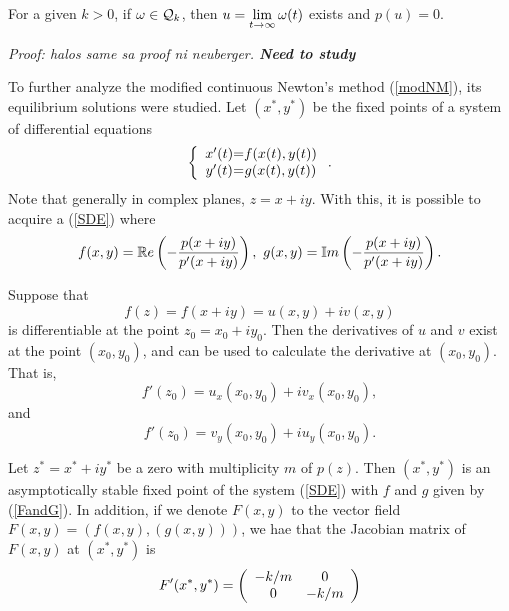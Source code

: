 \begin{thm}
	For a given $k>0$, if $\omega\in\mathcal{Q}_k$, then $u = \displaystyle\lim_{t\to\infty}\omega(t)$ exists and $p(u) = 0$.
\end{thm}
\textit{Proof: halos same sa proof ni neuberger. \textbf{Need to study}}


To further analyze the modified continuous Newton's method (\ref{modNM}), its equilibrium solutions were studied. Let $(x^*,y^*)$ be the 
fixed points of a system of differential equations
\begin{equation}	\label{SDE}
	\left\{ \begin{array}{c @{=} c}
		x'(t)	&	f(x(t),y(t))\\
		y'(t)	&	g(x(t),y(t))
	\end{array}\right. .
\end{equation}
Note that generally in complex planes, $z = x+iy$. With this, it is possible to acquire a (\ref{SDE}) where
\begin{equation}	\label{FandG}
	f(x,y) = \mathbb{R}e\left(	-\displaystyle\frac{p(x+iy)}{p'(x+iy)}	\right),\ g(x,y) = \mathbb{I}m\left(	-\displaystyle\frac{p(x+iy)}{p'(x+iy)}	\right) .
\end{equation}

\begin{thm}
	Suppose that $$f(z) = f(x+iy) = u(x,y) + iv(x,y)$$ is differentiable at the point $z_0 = x_0 + iy_0$. Then the derivatives of $u$ and $v$ exist at the point $(x_0,y_0)$, and can be used to calculate the derivative at $(x_0,y_0)$. That is,
	$$f'(z_0) = u_x(x_0,y_0) + iv_x(x_0,y_0),$$ and $$f'(z_0) = v_y(x_0,y_0) + iu_y(x_0,y_0).$$
\end{thm}

\begin{thm}
	Let $z^* = x^* + iy^*$ be a zero with multiplicity $m$ of $p(z)$. Then $(x^*,y^*)$ is an asymptotically stable fixed point of the system (\ref{SDE}) with $f$ and $g$ given by (\ref{FandG}). In addition, if we denote $F(x,y)$ to the vector field $F(x,y) = (f(x,y),(g(x,y)))$, we hae that the Jacobian matrix of $F(x,y)$ at $(x^*,y^*)$ is
	\begin{equation}
		F'(x^*,y^*) = \left(\begin{array}{c c}
							-k/m & 0\\
							0 & -k/m
					\end{array}\right)
	\end{equation}
\end{thm}

